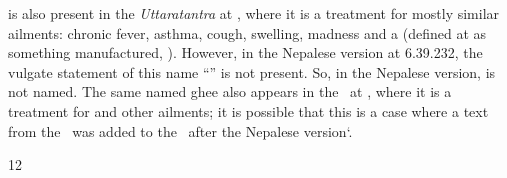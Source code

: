 \begin{translation}
{                is also present in the \emph{Uttaratantra} at
                , where it is a treatment for mostly
                similar ailments: chronic fever, asthma, cough, swelling, madness
                and a  (defined at
                 as something manufactured,
                ).  However, in the Nepalese version at 6.39.232,
                the vulgate statement of this name “” is not present. So, in the Nepalese
                version,  is not named. The same
                named ghee also appears in the \CS\ at , where it
                is a treatment for  and other ailments; it is
                possible that this is a case where a text from the \CS\ was added
                to the \SS\ after the Nepalese version`.}
    
    
\item [12]    
\end{translation}

